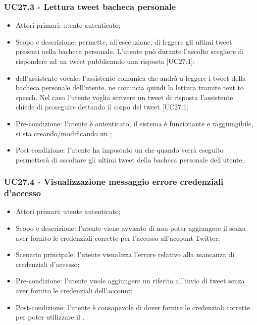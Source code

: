 \subsubsection{UC27.3 - Lettura tweet bacheca personale}
\begin{itemize}
	\item  Attori primari: utente autenticato;
	\item  Scopo e descrizione: permette, all'esecuzione, di leggere gli ultimi tweet presenti nella bacheca personale. L'utente può durante l'ascolto scegliere di rispondere ad un tweet pubblicando una risposta [UC27.1];
	\item  {} dell'assistente vocale: l'assistente comunica che andrà a leggere i tweet della bacheca personale dell'utente, ne comincia quindi la lettura tramite text to speech. Nel caso l'utente voglia scrivere un tweet di risposta l'assistente chiede di proseguire dettando il corpo del tweet [UC27.1;
	\item  Pre-condizione: l'utente è autenticato, il sistema è funzionante e raggiungibile, si sta creando/modificando un ;
	\item  Post-condizione: l'utente ha impostato un  che quando verrà eseguito permetterà di ascoltare gli ultimi tweet della bacheca personale dell'utente.
\end{itemize}
\subsubsection{UC27.4 - Visualizzazione messaggio errore credenziali d'accesso}
\begin{itemize}
	\item  Attori primari: utente autenticato;
	\item  Scopo e descrizione: l'utente viene avvisato di non poter aggiungere il  senza aver fornito le credenziali corrette per l'accesso all'account Twitter;
	\item  Scenario principale: l'utente visualizza l'errore relativo alla mancanza di credenziali d'accesso;
	\item  Pre-condizione: l'utente vuole aggiungere un  riferito all'invio di tweet senza aver fornito le credenziali dell'account;
	\item  Post-condizione: l'utente è consapevole di dover fornire le credenziali corrette per poter utilizzare il .
\end{itemize}

